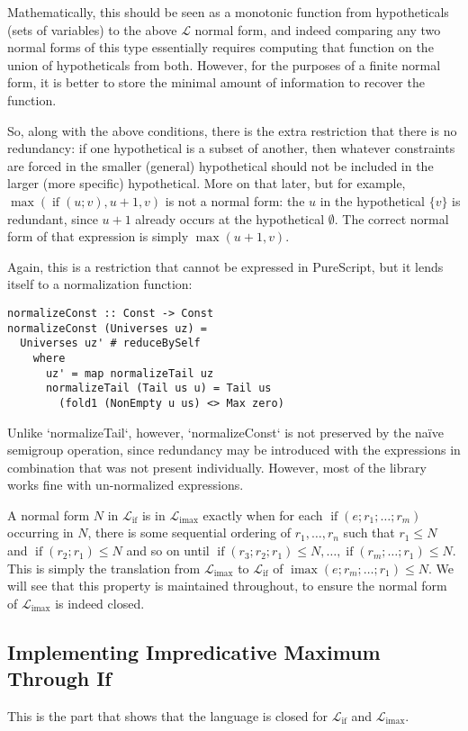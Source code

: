 \documentclass[11pt, twoside, reqno]{book}
\DeclareMathOperator{\imax}{imax}
\DeclareMathOperator{\ifop}{if}
\begin{document}
Mathematically, this should be seen as a monotonic function from hypotheticals (sets of variables) to the above \(\mathcal{L}\) normal form, and indeed comparing any two normal forms of this type essentially requires computing that function on the union of hypotheticals from both.
However, for the purposes of a finite normal form, it is better to store the minimal amount of information to recover the function.

So, along with the above conditions, there is the extra restriction that there is no redundancy: if one hypothetical is a subset of another, then whatever constraints are forced in the smaller (general) hypothetical should not be included in the larger (more specific) hypothetical.
More on that later, but for example, \(\max(\ifop(u; v), u + 1, v)\) is not a normal form: the \(u\) in the hypothetical \(\{v\}\) is redundant, since \(u + 1\) already occurs at the hypothetical \(\emptyset\).
The correct normal form of that expression is simply \(\max(u+1, v)\).

Again, this is a restriction that cannot be expressed in PureScript, but it lends itself to a normalization function:
\begin{verbatim}
normalizeConst :: Const -> Const
normalizeConst (Universes uz) =
  Universes uz' # reduceBySelf
    where
      uz' = map normalizeTail uz
      normalizeTail (Tail us u) = Tail us
        (fold1 (NonEmpty u us) <> Max zero)
\end{verbatim}
Unlike \inHS`normalizeTail`, however, \inHS`normalizeConst` is not preserved by the na\"ive semigroup operation, since redundancy may be introduced with the expressions in combination that was not present individually.
However, most of the library works fine with un-normalized expressions.

A normal form \(N\) in \(\mathcal{L}_{\ifop}\) is in \(\mathcal{L}_{\imax}\) exactly when for each \(\ifop(e; r_1; \dots; r_m)\) occurring in \(N\), there is some sequential ordering of \(r_1, \dots, r_n\) such that \(r_1 \le N\) and \(\ifop(r_2; r_1) \le N\) and so on until \(\ifop(r_3; r_2; r_1) \le N, \dots, \ifop(r_m; \dots; r_1) \le N\).
This is simply the translation from \(\mathcal{L}_{\imax}\) to \(\mathcal{L}_{\ifop}\) of \(\imax(e; r_m; \dots; r_1) \le N\).
We will see that this property is maintained throughout, to ensure the normal form of \(\mathcal{L}_{\imax}\) is indeed closed.

\subsection{Implementing Impredicative Maximum Through If}
This is the part that shows that the language is closed for \(\mathcal{L}_{\ifop}\) and \(\mathcal{L}_{\imax}\).
\end{document}
